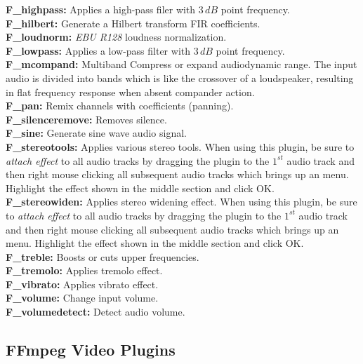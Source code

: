 \textbf{F\_highpass:} Applies a high-pass filer with $3\,dB$ point frequency.\\
\textbf{F\_hilbert:} Generate a Hilbert transform FIR coefficients.\\
\textbf{F\_loudnorm:} \textit{EBU R128} loudness normalization.\\
\textbf{F\_lowpass:} Applies a low-pass filter with $3\,dB$ point frequency.\\
\textbf{F\_mcompand:} Multiband Compress or expand audiodynamic range. The input audio is divided into bands which is like the crossover of a loudspeaker, resulting in flat frequency response when absent compander action.\\
\textbf{F\_pan:} Remix channels with coefficients (panning).\\
\textbf{F\_silenceremove:} Removes silence.\\
\textbf{F\_sine:} Generate sine wave audio signal.\\
\textbf{F\_stereotools:} Applies various stereo tools. When using this plugin, be sure to \textit{attach effect} to all audio tracks by dragging the plugin to the $1^{st}$ audio track and then right mouse clicking all subsequent audio tracks which brings up an menu. Highlight the effect shown in the middle section and click OK.\\
\textbf{F\_stereowiden:} Applies stereo widening effect. When using this plugin, be sure to \textit{attach effect} to all audio tracks by dragging the plugin to the $1^{st}$ audio track and then right mouse clicking all subsequent audio tracks which brings up an menu. Highlight the effect shown in the middle section and click OK.\\
\textbf{F\_treble:} Boosts or cuts upper frequencies.\\
\textbf{F\_tremolo:} Applies tremolo effect.\\
\textbf{F\_vibrato:} Applies vibrato effect.\\
\textbf{F\_volume:} Change input volume.\\
\textbf{F\_volumedetect:} Detect audio volume.

\subsection{FFmpeg Video Plugins}%
\label{sub:ffmpeg_video_plugins}

